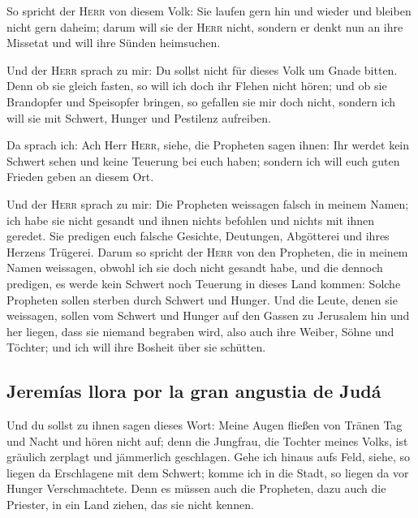  So spricht der \textsc{Herr} von diesem Volk: Sie laufen
gern hin und wieder und bleiben nicht gern daheim; darum will sie der
\textsc{Herr} nicht, sondern er denkt nun an ihre Missetat und will ihre
Sünden heimsuchen.

 Und der \textsc{Herr} sprach zu mir: Du sollst nicht für
dieses Volk um Gnade bitten.  Denn ob sie gleich fasten,
so will ich doch ihr Flehen nicht hören; und ob sie Brandopfer und
Speisopfer bringen, so gefallen sie mir doch nicht, sondern ich will sie
mit Schwert, Hunger und Pestilenz aufreiben.

 Da sprach ich: Ach Herr \textsc{Herr}, siehe, die
Propheten sagen ihnen: Ihr werdet kein Schwert sehen und keine Teuerung
bei euch haben; sondern ich will euch guten Frieden geben an diesem Ort.

 Und der \textsc{Herr} sprach zu mir: Die Propheten
weissagen falsch in meinem Namen; ich habe sie nicht gesandt und ihnen
nichts befohlen und nichts mit ihnen geredet. Sie predigen euch falsche
Gesichte, Deutungen, Abgötterei und ihres Herzens Trügerei.
 Darum so spricht der \textsc{Herr} von den Propheten,
die in meinem Namen weissagen, obwohl ich sie doch nicht gesandt habe,
und die dennoch predigen, es werde kein Schwert noch Teuerung in dieses
Land kommen: Solche Propheten sollen sterben durch Schwert und Hunger.
 Und die Leute, denen sie weissagen, sollen vom Schwert
und Hunger auf den Gassen zu Jerusalem hin und her liegen, dass sie
niemand begraben wird, also auch ihre Weiber, Söhne und Töchter; und ich
will ihre Bosheit über sie schütten.

\hypertarget{jeremuxedas-llora-por-la-gran-angustia-de-juduxe1}{%
\subsection{Jeremías llora por la gran angustia de
Judá}\label{jeremuxedas-llora-por-la-gran-angustia-de-juduxe1}}

 Und du sollst zu ihnen sagen dieses Wort: Meine Augen
fließen von Tränen Tag und Nacht und hören nicht auf; denn die Jungfrau,
die Tochter meines Volks, ist gräulich zerplagt und jämmerlich
geschlagen.  Gehe ich hinaus aufs Feld, siehe, so liegen
da Erschlagene mit dem Schwert; komme ich in die Stadt, so liegen da vor
Hunger Verschmachtete. Denn es müssen auch die Propheten, dazu auch die
Priester, in ein Land ziehen, das sie nicht kennen.

